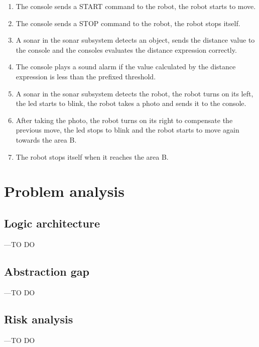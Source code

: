 \documentclass[a4paper]{article}
\begin{document}
\begin{enumerate}
			\item The console sends a START command to the robot, the robot starts to move.
			\item The console sends a STOP command to the robot, the robot stops itself.
			\item A sonar in the sonar subsystem detects an object, sends the distance value to the console and the consoles evaluates the distance expression correctly.
			\item The console plays a sound alarm if the value calculated by the distance expression is less than the prefixed threshold.
			\item A sonar in the sonar subsystem detects the robot, the robot turns on its left, the led starts to blink, the robot takes a photo and sends it to the console.
			\item After taking the photo, the robot turns on its right to compensate the previous move, the led stops to blink and the robot starts to move again towards the area B.
			\item The robot stops itself when it reaches the area B.
		\end{enumerate}


\section{Problem analysis }

\subsection{Logic architecture}
---TO DO

\subsection{Abstraction gap}
---TO DO

\subsection{Risk analysis}
---TO DO
\end{document}
